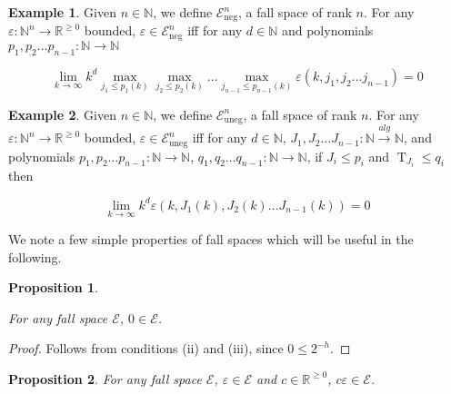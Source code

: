 \documentclass{article}
\numberwithin{equation}{section}
\theoremstyle{definition}
\newtheorem{example}{Example}[section]
\theoremstyle{plain}
\newtheorem{proposition}{Proposition}[section]
\DeclareMathOperator{\T}{T}
\newcommand{\Nats}{\mathbb{N}}
\newcommand{\Reals}{\mathbb{R}}
\newcommand{\Lim}[1]{\lim_{#1 \rightarrow \infty}}
\begin{document}
\begin{example}

Given $n \in \Nats$, we define $\mathcal{E}_{\text{neg}}^n$, a fall space of rank $n$. For any $\varepsilon: \Nats^n \rightarrow \Reals^{\geq 0}$ bounded, $\varepsilon \in \mathcal{E}_{\text{neg}}^n$ iff for any $d \in \Nats$ and polynomials ${p_1,p_2 \ldots p_{n-1}: \Nats \rightarrow \Nats}$

$$\Lim{k} k^d \max_{j_1 \leq p_1(k)} \max_{j_2 \leq p_2(k)} \ldots \max_{j_{n-1} \leq p_{n-1}(k)} \varepsilon(k,j_1,j_2 \ldots j_{n-1}) = 0$$

\end{example}

\begin{example}

Given $n \in \Nats$, we define $\mathcal{E}_{\text{uneg}}^n$, a fall space of rank $n$. For any ${\varepsilon: \Nats^n \rightarrow \Reals^{\geq 0}}$ bounded, $\varepsilon \in \mathcal{E}_{\text{uneg}}^n$ iff for any $d \in \Nats$, ${J_1,J_2 \ldots J_{n-1}: \Nats \xrightarrow{alg} \Nats}$, and polynomials ${p_1,p_2 \ldots p_{n-1}: \Nats \rightarrow \Nats}$, ${q_1,q_2 \ldots q_{n-1}: \Nats \rightarrow \Nats}$, if $J_i \leq p_i$ and $\T_{J_i} \leq q_i$ then

$$\Lim{k} k^d \varepsilon(k,J_1(k),J_2(k) \ldots J_{n-1}(k)) = 0$$

\end{example}

We note a few simple properties of fall spaces which will be useful in the following.

\begin{proposition}
\label{prp:err_spc_zero}

For any fall space $\mathcal{E}$, $0 \in \mathcal{E}$.

\end{proposition}

\begin{proof}

Follows from conditions (ii) and (iii), since $0 \leq 2^{-h}$.

\end{proof}

\begin{proposition}

For any fall space $\mathcal{E}$, $\varepsilon \in \mathcal{E}$ and $c \in \Reals^{\geq 0}$, $c \varepsilon \in \mathcal{E}$.

\end{proposition}
\end{document}
